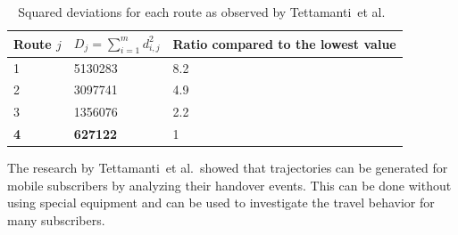 \documentclass[master,english]{hgbthesis}
\begin{document}
\begin{table}[h]
\begin{tabular}{l|ll}
\hline
Route $j$                   &  $D_j=\sum_{i=1}^{m} d_{i,j}^{2}$ & Ratio compared to
the lowest value  \\ \hline
1&5130283&8.2 \\
2&3097741&4.9 \\
3&1356076&2.2 \\
\textbf{4}  &\textbf{627122} &1 \\ \hline
\end{tabular}
\caption{Squared deviations for each route as observed by Tettamanti~et al.\ \cite{Tettamanti2012}}
\label{tab:tetta}
\end{table}
The research by Tettamanti~et al.\ showed that trajectories can be generated for mobile subscribers by analyzing their handover events. This can be done without using special equipment and can be used to investigate the travel behavior for many subscribers.
\end{document}
